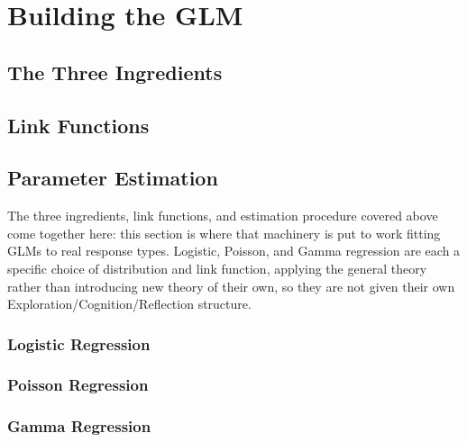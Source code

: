 \part{Building the GLM}

\chapter{The Three Ingredients}

\Exploration
\tbc

\Cognition
\tbc

\Reflection
\tbc

\Application
\tbc


\chapter{Link Functions}

\Exploration
\tbc

\Cognition
\tbc

\Reflection
\tbc

\Application
\tbc


\chapter{Parameter Estimation}

\Exploration
\tbc

\Cognition
\tbc

\Reflection
\tbc

\Application

The three ingredients, link functions, and estimation procedure covered above come together here: this section is where that machinery is put to work fitting GLMs to real response types. Logistic, Poisson, and Gamma regression are each a specific choice of distribution and link function, applying the general theory rather than introducing new theory of their own, so they are not given their own Exploration/Cognition/Reflection structure.

\section{Logistic Regression}
\tbc

\section{Poisson Regression}
\tbc

\section{Gamma Regression}
\tbc
